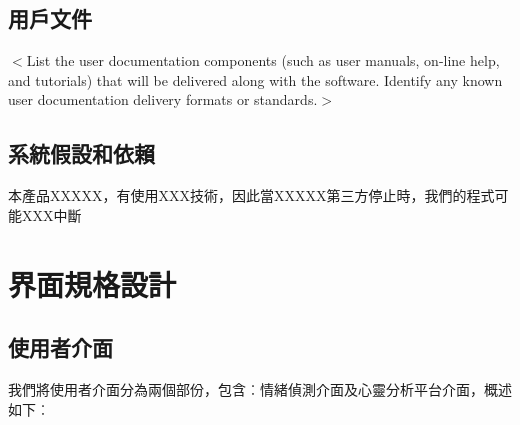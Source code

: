 \documentclass[12pt]{scrreprt}
\begin{document}
\section{用戶文件}
$<$List the user documentation components (such as user manuals, on-line help, 
and tutorials) that will be delivered along with the software. Identify any 
known user documentation delivery formats or standards.$>$
\section{系統假設和依賴}
本產品XXXXX，有使用XXX技術，因此當XXXXX第三方停止時，我們的程式可能XXX中斷


\chapter{界面規格設計}

\section{使用者介面}

我們將使用者介面分為兩個部份，包含︰情緒偵測介面及心靈分析平台介面，概述如下︰
\end{document}
